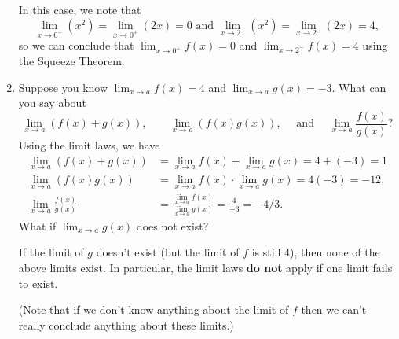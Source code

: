 \documentclass[12pt]{article}
\newcommand{\di}{\displaystyle}
\begin{document}
\begin{enumerate}
In this case, we note that
\[
\lim_{x\to 0^+}(x^2) = \lim_{x\to 0^+}(2x)=0 \text{ and } \lim_{x\to 2^-}(x^2)=\lim_{x\to 2^-}(2x) = 4,
\] 
so we can conclude that $\di\lim_{x\to 0^+}f(x)=0$ and $\di \lim_{x\to 2^-}f(x)=4$ using the Squeeze Theorem.
 
   
   \item Suppose you know $\di\lim_{x\to a}f(x)=4$ and $\di \lim_{x\to a}g(x)=-3$. What can you say about
   \[
   \lim_{x\to a}(f(x)+g(x)), \quad\quad \lim_{x\to a}(f(x)g(x)),\quad \text{ and } \quad \lim_{x\to a} \frac{f(x)}{g(x)}?
   \]
   Using the limit laws, we have
   \begin{align*}
      \lim_{x\to a}(f(x)+g(x))&=\lim_{x\to a}f(x)+\lim_{x\to a}g(x)=4+(-3)=1\\
      \lim_{x\to a}(f(x)g(x))&=\lim_{x\to a}f(x)\cdot\lim_{x\to a}g(x)=4(-3)=-12, \tag{and}\\
      \lim_{x\to a}\frac{f(x)}{g(x)}&=\frac{\lim_{x\to a}f(x)}{\lim_{x\to a}g(x)}=\frac{4}{-3}=-4/3.
      \end{align*}
   What if $\di\lim_{x\to a}g(x)$ does not exist?
   
   If the limit of $g$ doesn't exist (but the limit of $f$ is still 4), then none of the above limits exist. In particular, the limit laws \textbf{do not} apply if one limit fails to exist.
   
   (Note that if we don't know anything about the limit of $f$ then we can't really conclude anything about these limits.)
  \end{enumerate}
\end{document}
